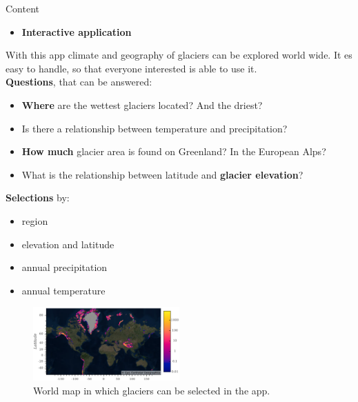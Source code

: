 \documentclass[final]{beamer}
\newcommand*{\smalllogo}[1]{%
	\raisebox{-.3\baselineskip}{%
		\texttt{[image: \#1]}%
	}%
}
\begin{document}
\begin{frame}[fragile]
		\begin{boxblock}{\hspace*{1cm}Content}
			\begin{itemize} \item[\smalllogo{lupe_rot.png}] \textbf{Interactive application} \end{itemize}
			\begin{multicols}{2}
						{\normalsize{
						With this app climate and geography of glaciers can be explored world wide. It es easy to handle, so that everyone interested is able to use it.\\
						\vspace*{1cm} 
						\textbf{Questions}, that can be answered:
				\begin{itemize}
						\item \textbf{Where} are the wettest glaciers located? And the driest?
						\item Is there a relationship between temperature and precipitation?
						\item \textbf{How much} glacier area is found on Greenland? In the European Alps? 
						\item What is the relationship between latitude and \textbf{glacier elevation}?
				\end{itemize}
						\vspace*{1cm} 
						\textbf{Selections} by:
				\begin{itemize}
						\item	region
						\item	elevation and latitude
						\item	annual precipitation
						\item	annual temperature
				\end{itemize}
				}}
			\columnbreak
				\begin{figure}
						\includegraphics[width=0.50\textwidth]{app_map} 
						\caption{World map in which glaciers can be selected in the app.}
				\end{figure}
			\end{multicols}
	\end{boxblock}


\end{frame}
\end{document}
